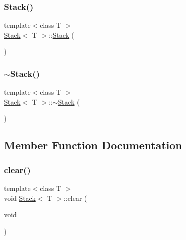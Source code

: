 \subsubsection{\texorpdfstring{Stack()}{Stack()}}
{\footnotesize\ttfamily template$<$class T $>$ \\
\hyperlink{class_stack}{Stack}$<$ T $>$\+::\hyperlink{class_stack}{Stack} (\begin{DoxyParamCaption}{ }\end{DoxyParamCaption})}

\mbox{\label{class_stack_a9e7a00875aefbdac560ab189b7bc61d1}} 
\subsubsection{\texorpdfstring{$\sim$\+Stack()}{~Stack()}}
{\footnotesize\ttfamily template$<$class T $>$ \\
\hyperlink{class_stack}{Stack}$<$ T $>$\+::$\sim$\hyperlink{class_stack}{Stack} (\begin{DoxyParamCaption}{ }\end{DoxyParamCaption})\hspace{0.3cm}{\ttfamily [virtual]}}



\subsection{Member Function Documentation}
\mbox{\label{class_stack_a3c61803e66a926722c554146c735891c}} 
\subsubsection{\texorpdfstring{clear()}{clear()}}
{\footnotesize\ttfamily template$<$class T $>$ \\
void \hyperlink{class_stack}{Stack}$<$ T $>$\+::clear (\begin{DoxyParamCaption}\item[{void}]{ }\end{DoxyParamCaption})}

\mbox{\label{class_stack_a42d11c2270f931a753c6104b18990688}} 
